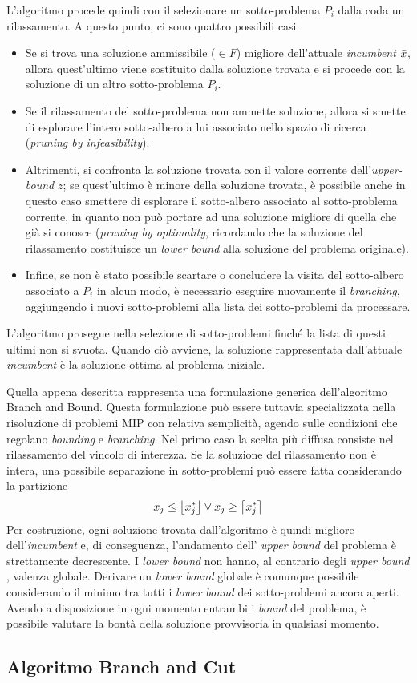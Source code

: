 L'algoritmo procede quindi con il selezionare un sotto-problema $P_i$ dalla coda un rilassamento. A questo punto, ci sono quattro 
possibili casi
\begin{itemize}

\item Se si trova una soluzione ammissibile ($\in F$) migliore dell'attuale \textit{incumbent} $\Bar{x}$, allora quest'ultimo viene 
sostituito dalla soluzione trovata e si procede con la soluzione di un altro sotto-problema $P_i$.
\item Se il rilassamento del sotto-problema non ammette soluzione, allora si smette di esplorare l'intero sotto-albero a lui associato 
nello spazio di ricerca (\textit{pruning by infeasibility}).
\item Altrimenti, si confronta la soluzione trovata con il valore corrente dell'\textit{upper-bound} $z$; se quest'ultimo è minore 
della soluzione trovata, è possibile anche in questo caso smettere di esplorare il sotto-albero associato al sotto-problema corrente,
in quanto non può portare ad una soluzione migliore di quella che già si conosce (\textit{pruning by optimality}, ricordando che la
soluzione del rilassamento costituisce un \textit{lower bound} alla soluzione del problema originale).
\item Infine, se non è stato possibile scartare o concludere la visita del sotto-albero associato a $P_i$ in alcun modo, è necessario
eseguire nuovamente il \textit{branching}, aggiungendo i nuovi sotto-problemi alla lista dei sotto-problemi da processare.
\end{itemize}
L'algoritmo prosegue nella selezione di sotto-problemi finché la lista di questi ultimi non si svuota. Quando ciò avviene, la soluzione
rappresentata dall'attuale \textit{incumbent} è la soluzione ottima al problema iniziale.

Quella appena descritta rappresenta una formulazione generica dell'algoritmo Branch and Bound. Questa formulazione può essere
tuttavia specializzata nella risoluzione di problemi MIP con relativa semplicità, agendo sulle condizioni che regolano 
\textit{bounding} e \textit{branching}. Nel primo caso la scelta più diffusa consiste nel rilassamento del vincolo di interezza.
Se la soluzione del rilassamento non è intera, una possibile separazione in sotto-problemi può essere fatta considerando la partizione
\begin{align*}
x_j \leq \floor*{x_j^*} \vee x_j \geq \ceil*{x_j^*}
\end{align*}
Per costruzione, ogni soluzione trovata dall'algoritmo è quindi migliore dell'\textit{incumbent} e, di conseguenza, l'andamento dell'
\textit{upper bound} del problema è strettamente decrescente. I \textit{lower bound} non hanno, al contrario degli 
\textit{upper bound} , valenza globale. Derivare un \textit{lower bound} globale è comunque possibile considerando il minimo tra tutti
i \textit{lower bound} dei sotto-problemi ancora aperti. Avendo a disposizione in ogni momento entrambi i \textit{bound} del problema, 
è possibile valutare la bontà della soluzione provvisoria in qualsiasi momento. 

\subsection{Algoritmo Branch and Cut}